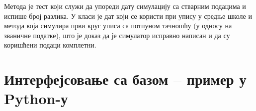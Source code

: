 Метода  је тест који служи да упореди дату симулацију са стварним подацима и испише број разлика. У класи  је дат  који се користи при упису у средње школе и  метода која симулира први круг уписа са потпуном тачношћу (у односу на званичне податке), што је доказ да је симулатор исправно написан и да су коришћени подаци комплетни.


\section{Интерфејсовање са базом -- пример у Python-у}
